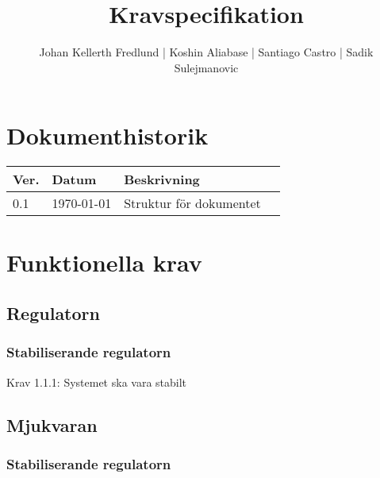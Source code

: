\documentclass[a4paper]{article}
\title{Kravspecifikation}
\author{Johan Kellerth Fredlund | Koshin Aliabase | Santiago Castro | Sadik Sulejmanovic}
\date{}
\begin{document}
\maketitle
\thispagestyle{fancy}
\tableofcontents
\newpage

\section*{Dokumenthistorik}

\begin{tabular}{ l l l p{8.5cm} }
Ver. & Datum & Beskrivning \\\hline
0.1 & \today  & Struktur för dokumentet\\
\end{tabular}



\section{Funktionella krav}
	\subsection{Regulatorn}
		\subsubsection{Stabiliserande regulatorn}
        	Krav 1.1.1: Systemet ska vara stabilt
	
    \subsection{Mjukvaran}
		\subsubsection{Stabiliserande regulatorn}
\end{document}
